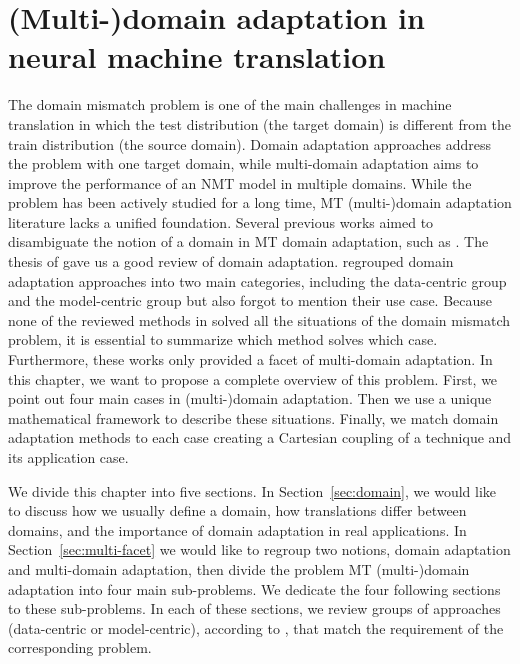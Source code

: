 \chapter{(Multi-)domain adaptation in neural machine translation} \label{chap:mdmt-review}
The domain mismatch problem is one of the main challenges in machine translation \citep{koehn17six} in which the test distribution (the target domain) is different from the train distribution (the source domain). Domain adaptation approaches address the problem with one target domain, while multi-domain adaptation aims to improve the performance of an NMT model in multiple domains. While the problem has been actively studied for a long time, MT (multi-)domain adaptation literature lacks a unified foundation. Several previous works aimed to disambiguate the notion of a domain in MT domain adaptation, such as \cite{Wees15Whats,Wees17Whats,Saunders21Domain}. The thesis of \cite{Saunders21Domain} gave us a good review of domain adaptation. \citet{Chu18asurvey} regrouped domain adaptation approaches into two main categories, including the data-centric group and the model-centric group but also forgot to mention their use case. Because none of the reviewed methods in \citet{Chu18asurvey} solved all the situations of the domain mismatch problem, it is essential to summarize which method solves which case. Furthermore, these works only provided a facet of multi-domain adaptation. In this chapter, we want to propose a complete overview of this problem. First, we point out four main cases in (multi-)domain adaptation. Then we use a unique mathematical framework to describe these situations. Finally, we match domain adaptation methods to each case creating a Cartesian coupling of a technique and its application case.

We divide this chapter into five sections. In Section~\ref{sec:domain}, we would like to discuss how we usually define a domain, how translations differ between domains, and the importance of domain adaptation in real applications. In Section~\ref{sec:multi-facet} we would like to regroup two notions, domain adaptation and multi-domain adaptation, then divide the problem MT (multi-)domain adaptation into four main sub-problems. We dedicate the four following sections to these sub-problems. In each of these sections, we review groups of approaches (data-centric or model-centric), according to \citet{Chu18survey}, that match the requirement of the corresponding problem.
